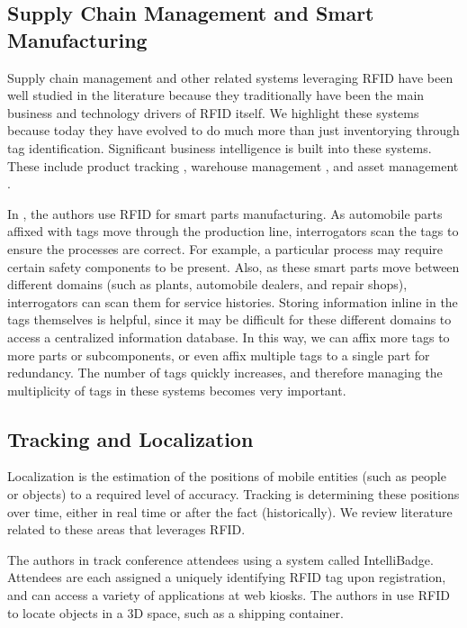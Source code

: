 \subsection{Supply Chain Management and Smart Manufacturing}
Supply chain management and other related systems leveraging RFID have been well studied in the literature because they traditionally have been the main business and technology drivers of RFID itself. We highlight these systems because today they have evolved to do much more than just inventorying through tag identification. Significant business intelligence is built into these systems. These include product tracking \cite{2011 Ko}, warehouse management \cite{2010 Liu}, and asset management \cite{2008 Inaba}.

In \cite{2004 Li}, the authors use RFID for smart parts manufacturing. As automobile parts affixed with tags move through the production line, interrogators scan the tags to ensure the processes are correct. For example, a particular process may require certain safety components to be present. Also, as these smart parts move between different domains (such as plants, automobile dealers, and repair shops), interrogators can scan them for service histories. Storing information inline in the tags themselves is helpful, since it may be difficult for these different domains to access a centralized information database. In this way, we can affix more tags to more parts or subcomponents, or even affix multiple tags to a single part for redundancy. The number of tags quickly increases, and therefore managing the multiplicity of tags in these systems becomes very important.

\subsection{Tracking and Localization}
Localization is the estimation of the positions of mobile entities (such as people or objects) to a required level of accuracy.  Tracking is determining these positions over time, either in real time or after the fact (historically). We review literature related to these areas that leverages RFID.  

The authors in \cite{2003 Cox} track conference attendees using a system called IntelliBadge.  Attendees are each assigned a uniquely identifying RFID tag upon registration, and can access a variety of applications at web kiosks.  The authors in \cite{2007 Wang} use RFID to locate objects in a 3D space, such as a shipping container.

